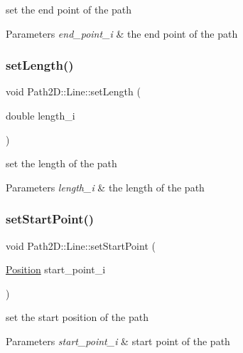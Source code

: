 set the end point of the path 


\begin{DoxyParams}{Parameters}
{\em end\+\_\+point\+\_\+i} & the end point of the path \\
\hline
\end{DoxyParams}
\mbox{\label{class_path2_d_1_1_line_a8934b16e891581297a40736e3bbee8f4}} 
\subsubsection{\texorpdfstring{set\+Length()}{setLength()}}
{\footnotesize\ttfamily void Path2\+D\+::\+Line\+::set\+Length (\begin{DoxyParamCaption}\item[{double}]{length\+\_\+i }\end{DoxyParamCaption})}



set the length of the path 


\begin{DoxyParams}{Parameters}
{\em length\+\_\+i} & the length of the path \\
\hline
\end{DoxyParams}
\mbox{\label{class_path2_d_1_1_line_a981461ff075dfd005665498903c2f1fa}} 
\subsubsection{\texorpdfstring{set\+Start\+Point()}{setStartPoint()}}
{\footnotesize\ttfamily void Path2\+D\+::\+Line\+::set\+Start\+Point (\begin{DoxyParamCaption}\item[{\mbox{\hyperlink{class_path2_d_1_1_position}{Position}}}]{start\+\_\+point\+\_\+i }\end{DoxyParamCaption})}



set the start position of the path 


\begin{DoxyParams}{Parameters}
{\em start\+\_\+point\+\_\+i} & start point of the path \\
\hline
\end{DoxyParams}
\mbox{\label{class_path2_d_1_1_line_ad9ade8519fb65590d1d17162f05fa057}} 
